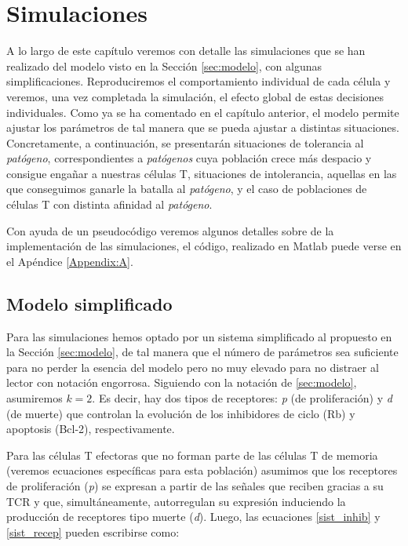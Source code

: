 
\chapter{Simulaciones}
\label{cap:simulaciones}

A lo largo de este capítulo veremos con detalle las simulaciones que se han realizado del modelo visto en la Sección \ref{sec:modelo}, con algunas simplificaciones. Reproduciremos el comportamiento individual de cada célula y veremos, una vez completada la simulación, el efecto global de estas decisiones individuales. Como ya se ha comentado en el capítulo anterior, el modelo permite ajustar los parámetros de tal manera que se pueda ajustar a distintas situaciones. Concretamente, a continuación, se presentarán situaciones de tolerancia al \textit{patógeno}, correspondientes a \textit{patógenos} cuya población crece más despacio y consigue engañar a nuestras células T, situaciones de intolerancia, aquellas en las que conseguimos ganarle la batalla al \textit{patógeno}, y el caso de poblaciones de células T con distinta afinidad al \textit{patógeno}.

Con ayuda de un pseudocódigo veremos algunos detalles sobre de la implementación de las simulaciones, el código, realizado en Matlab puede verse en el Apéndice \ref{Appendix:A}.


\section{Modelo simplificado}

Para las simulaciones hemos optado por un sistema simplificado al propuesto en la Sección \ref{sec:modelo}, de tal manera que el número de parámetros sea suficiente para no perder la esencia del modelo pero no muy elevado para no distraer al lector con notación engorrosa. Siguiendo con la notación de \ref{sec:modelo}, asumiremos $k=2$. Es decir, hay dos tipos de receptores: \textit{p} (de proliferación) y \textit{d} (de muerte) que controlan
la evolución de los inhibidores de ciclo (Rb) y apoptosis (Bcl-2), respectivamente.

Para las células T efectoras que no forman parte de las células T de memoria (veremos ecuaciones específicas para esta población) asumimos que los receptores de proliferación (\textit{p}) se expresan a partir de las señales que reciben gracias a su TCR y que, simultáneamente, autorregulan su expresión induciendo la producción de receptores tipo muerte (\textit{d}). Luego, las ecuaciones \ref{sist_inhib} y \ref{sist_recep} pueden escribirse como:

